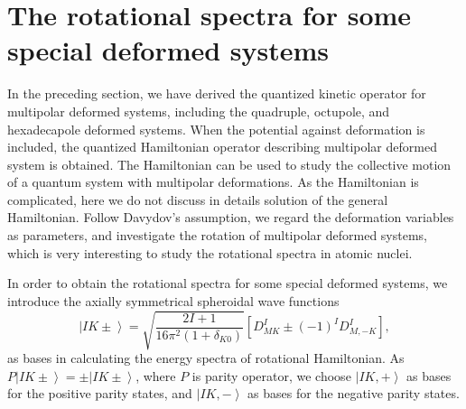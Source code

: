 \documentclass[twocolumn,prc,showpacs,preprintnumbers,superscriptaddress,floatfix]{revtex4}
\begin{document}
\section{The rotational spectra for some special deformed systems}

In the preceding section, we have derived the quantized kinetic operator for
multipolar deformed systems, including the quadruple, octupole, and
hexadecapole deformed systems. When the potential against deformation is
included, the quantized Hamiltonian operator describing multipolar deformed
system is obtained. The Hamiltonian can be used to study the collective
motion of a quantum system with multipolar deformations. As the Hamiltonian
is complicated, here we do not discuss in details solution of the general
Hamiltonian. Follow Davydov's assumption, we regard the deformation
variables as parameters, and investigate the rotation of multipolar deformed
systems, which is very interesting to study the rotational spectra in atomic
nuclei.

In order to obtain the rotational spectra for some special deformed systems,
we introduce the axially symmetrical spheroidal wave functions
\begin{equation}
\left\vert IK\pm \right\rangle =\sqrt{\frac{2I+1}{16\pi ^{2}\left( 1+\delta
_{K0}\right) }}\left[ D_{MK}^{I}\pm \left( -1\right) ^{I}D_{M,-K}^{I}\right],
\end{equation}%
as bases in calculating the energy spectra of rotational Hamiltonian. As $%
P\left\vert IK\pm \right\rangle =\pm \left\vert IK\pm \right\rangle $, where
$P$ is parity operator, we choose $\left\vert IK,+\right\rangle $ as bases
for the positive parity states, and $\left\vert IK,-\right\rangle $ as bases
for the negative parity states.
\end{document}
